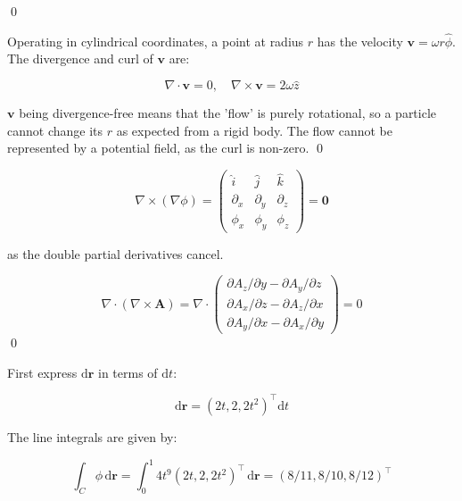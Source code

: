 \documentclass[12pt]{article}
\begin{document}
\qed


Operating in cylindrical coordinates, a point at radius $r$ has the velocity $\mathbf{v} = \omega r \hat{\phi}$. The divergence and curl of $\mathbf{v}$ are:

\begin{equation}
    \nabla \cdot \mathbf{v} = 0, \quad \nabla \times \mathbf{v} = 2\omega \hat{z}
\end{equation}

$\mathbf{v}$ being divergence-free means that the 'flow' is purely rotational, so a particle cannot change its $r$ as expected from a rigid body. The flow cannot be represented by a potential field, as the curl is non-zero.
\qed



\begin{equation}
    \nabla \times (\nabla \phi)
    =
    \begin{pmatrix}
        \hat{i} & \hat{j} & \hat{k} \\
        \partial_{x} & \partial_{y} & \partial_{z} \\
        \phi_{x} & \phi_{y} & \phi_{z}
    \end{pmatrix}
    =
    \mathbf{0}
\end{equation}

as the double partial derivatives cancel.

\begin{equation}
    \nabla \cdot (\nabla \times \mathbf{A})
    =
    \nabla \cdot \begin{pmatrix}
        \partial A_{z}/\partial y - \partial A_{y}/\partial z  \\
        \partial A_{x}/\partial z - \partial A_{z}/\partial x  \\
        \partial A_{y}/\partial x - \partial A_{x}/\partial y
    \end{pmatrix}
    = 0
\end{equation}
\qed


First express $\mathrm{d}\mathbf{r}$ in terms of $\mathrm{d}t$:

\begin{equation}
    \mathrm{d}\mathbf{r} = (2t, 2, 2t^{2})^{\intercal} \mathrm{d}t
\end{equation}

The line integrals are given by:

\begin{equation}
    \int_{C} \phi \, \mathrm{d}\mathbf{r} = \int_{0}^{1} 4t^{9} (2t, 2, 2t^{2})^{\intercal} \, \mathrm{d}\mathbf{r} = (8/11, 8/10, 8/12)^{\intercal}
\end{equation}
\end{document}
